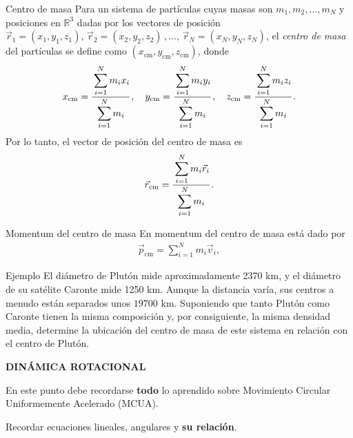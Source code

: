 \begin{frame}{Centro de masa}
    Para un sistema de partículas cuyas masas son $m_1,m_2,\dots,m_N$ y posiciones en $\mathbb{R}^3$ dadas por los vectores de posición $\vec{r}_1=(x_1,y_1,z_1),\,\vec{r}_2=(x_2,y_2,z_2)\,,\dots,\,\vec{r}_N=(x_N,y_N,z_N)$, el \textit{centro de masa} del partículas se define como $(x_\text{cm},y_\text{cm},z_\text{cm})$, donde \begin{align*}
x_\text{cm}=\cfrac{\displaystyle\sum_{i=1}^N m_i x_i}{\displaystyle\sum_{i=1}^N m_i}\,, \quad
y_\text{cm}=\cfrac{\displaystyle\sum_{i=1}^N m_i y_i}{\displaystyle\sum_{i=1}^N m_i}\,, \quad
z_\text{cm}=\cfrac{\displaystyle\sum_{i=1}^N m_i z_i}{\displaystyle\sum_{i=1}^N m_i}\,.
\end{align*} Por lo tanto, el vector de posición del centro de masa es \begin{align*}
\vec{r}_\text{cm}=\cfrac{\displaystyle\sum_{i=1}^N m_i \vec{r}_i}{\displaystyle\sum_{i=1}^N m_i}\,.
\end{align*}

\end{frame}

\begin{frame}{Momentum del centro de masa}
    En momentum del centro de masa está dado por
    \begin{align*}
        \vec{p}_\text{cm}=\displaystyle\sum_{i=1}^N m_i\vec{v}_i,
    \end{align*}
\end{frame}

\begin{frame}{Ejemplo}
    El diámetro de Plutón mide aproximadamente 2370 km, y el diámetro de su satélite Caronte mide 1250 km. Aunque la distancia varía, sus centros a menudo están separados unos $\num{19700}$ km. Suponiendo que tanto Plutón como Caronte tienen la misma composición y, por consiguiente, la misma densidad media, determine la ubicación del centro de masa de este sistema en relación con el centro de Plutón.
\end{frame}

\begin{frame}
    \Huge \begin{center}
        \textbf{DINÁMICA ROTACIONAL}
        
\vspace{2em}

    \large En este punto debe recordarse \textbf{todo} lo aprendido sobre Movimiento Circular Uniformemente Acelerado (MCUA).

    \vspace{1em}

    Recordar ecuaciones lineales, angulares y \textbf{su relación}.
    \end{center}
\end{frame}

